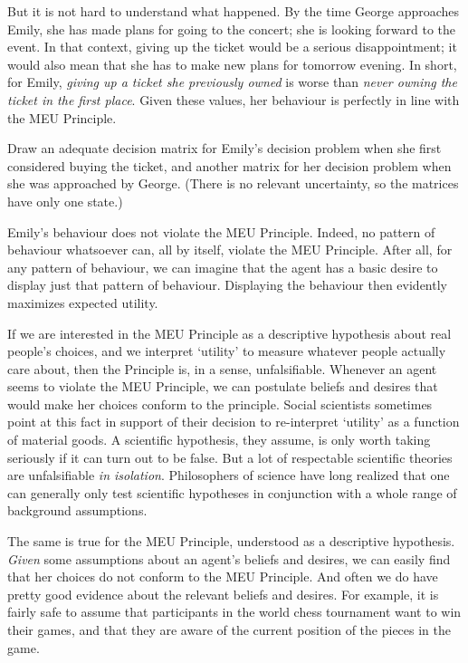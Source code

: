 But it is not hard to understand what happened. By the time George
approaches Emily, she has made plans for going to the concert; she is
looking forward to the event. In that context, giving up the ticket
would be a serious disappointment; it would also mean that she has to
make new plans for tomorrow evening. In short, for Emily, \emph{giving
  up a ticket she previously owned} is worse than \emph{never owning
  the ticket in the first place}. Given these values, her behaviour is
perfectly in line with the MEU Principle.

\begin{exercise}{2}
  Draw an adequate decision matrix for Emily's decision problem when
  she first considered buying the ticket, and another matrix for her
  decision problem when she was approached by George. (There is no
  relevant uncertainty, so the matrices have only one state.)
\end{exercise}

Emily's behaviour does not violate the MEU Principle. Indeed, no
pattern of behaviour whatsoever can, all by itself, violate the MEU
Principle. After all, for any pattern of behaviour, we can imagine
that the agent has a basic desire to display just that pattern of
behaviour. Displaying the behaviour then evidently maximizes expected
utility.

If we are interested in the MEU Principle as a descriptive hypothesis about real
people's choices, and we interpret `utility' to measure whatever people actually
care about, then the Principle is, in a sense, unfalsifiable. Whenever an agent
seems to violate the MEU Principle, we can postulate beliefs and desires that
would make her choices conform to the principle. Social scientists sometimes
point at this fact in support of their decision to re-interpret `utility' as a
function of material goods. A scientific hypothesis, they assume, is only worth
taking seriously if it can turn out to be false. But a lot of respectable
scientific theories are unfalsifiable \emph{in isolation}. Philosophers of
science have long realized that one can generally only test scientific
hypotheses in conjunction with a whole range of background assumptions.

The same is true for the MEU Principle, understood as a descriptive
hypothesis. \emph{Given} some assumptions about an agent's beliefs and
desires, we can easily find that her choices do not conform to the MEU
Principle. And often we do have pretty good evidence about the
relevant beliefs and desires. For example, it is fairly safe to assume
that participants in the world chess tournament want to win their
games, and that they are aware of the current position of the pieces
in the game.

